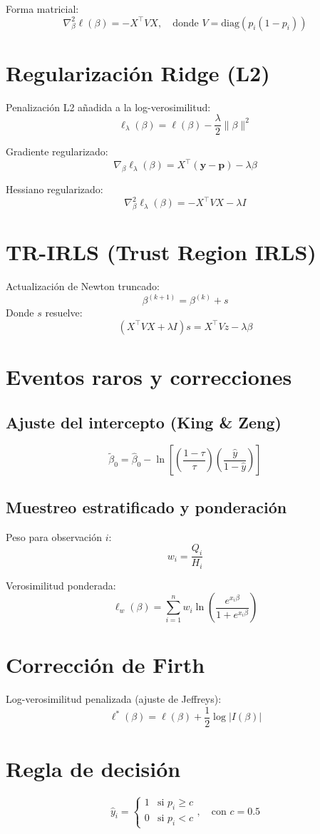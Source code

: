 \documentclass[12pt]{article}
\begin{document}
Forma matricial:
\[
    \nabla^2_\beta \ell(\beta) = - X^\top V X, \quad \text{donde } V = \text{diag}(p_i (1 - p_i))
\]

\section*{Regularización Ridge (L2)}

Penalización L2 añadida a la log-verosimilitud:
\[
    \ell_\lambda(\beta) = \ell(\beta) - \frac{\lambda}{2} \|\beta\|^2
\]

Gradiente regularizado:
\[
    \nabla_\beta \ell_\lambda(\beta) = X^\top (\mathbf{y} - \mathbf{p}) - \lambda \beta
\]

Hessiano regularizado:
\[
    \nabla^2_\beta \ell_\lambda(\beta) = - X^\top V X - \lambda I
\]

\section*{TR-IRLS (Trust Region IRLS)}
Actualización de Newton truncado:
\[
    \beta^{(k+1)} = \beta^{(k)} + s
\]
Donde $s$ resuelve:
\[
    (X^\top V X + \lambda I) s = X^\top V z - \lambda \beta
\]

\section*{Eventos raros y correcciones}

\subsection*{Ajuste del intercepto (King \& Zeng)}
\[
    \tilde{\beta}_0 = \hat{\beta}_0 - \ln \left[ \left( \frac{1 - \tau}{\tau} \right) \left( \frac{\hat{y}}{1 - \hat{y}} \right) \right]
\]

\subsection*{Muestreo estratificado y ponderación}
Peso para observación $i$:
\[
    w_i = \frac{Q_i}{H_i}
\]

Verosimilitud ponderada:
\[
    \ell_w(\beta) = \sum_{i=1}^n w_i \ln \left( \frac{e^{x_i \beta}}{1 + e^{x_i \beta}} \right)
\]

\section*{Corrección de Firth}

Log-verosimilitud penalizada (ajuste de Jeffreys):
\[
    \ell^*(\beta) = \ell(\beta) + \frac{1}{2} \log |I(\beta)|
\]

\section*{Regla de decisión}

\[
    \hat{y}_i =
    \begin{cases}
        1 & \text{si } p_i \geq c \\
        0 & \text{si } p_i < c
    \end{cases}, \quad \text{con } c = 0.5
\]
\end{document}
